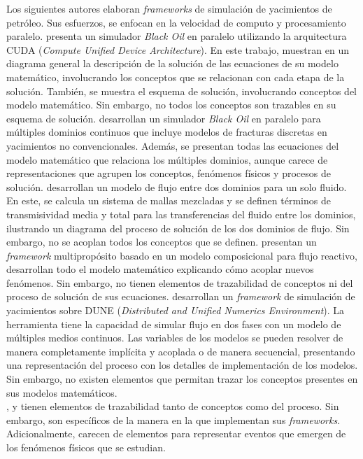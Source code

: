 Los siguientes autores elaboran \textit{frameworks} de simulación de yacimientos de petróleo. Sus esfuerzos, se enfocan en la velocidad de computo y procesamiento paralelo. \cite{Zaza2016} presenta un simulador \textit{Black Oil} en paralelo utilizando la arquitectura CUDA (\textit{Compute Unified Device Architecture}). En este trabajo, \cite{Zaza2016} muestran en un diagrama general la descripción de la solución de las ecuaciones de su modelo matemático, involucrando los conceptos que se relacionan con cada etapa de la solución. También, se muestra el esquema de solución, involucrando conceptos del modelo matemático. Sin embargo, no todos los conceptos son trazables en su esquema de solución. \cite{Wang2016, Wang2017} desarrollan un simulador \textit{Black Oil} en paralelo para múltiples dominios continuos que incluye modelos de fracturas discretas en yacimientos no convencionales. Además, se presentan todas las ecuaciones del modelo matemático que relaciona los múltiples dominios, aunque carece de representaciones que agrupen los conceptos, fenómenos físicos y procesos de solución. \cite{FANG2017} desarrollan un modelo de flujo entre dos dominios para un solo fluido. En este, se calcula un sistema de mallas mezcladas y se definen términos de transmisividad media y total para las transferencias del fluido entre los dominios, ilustrando un diagrama del proceso de solución de los dos dominios de flujo. Sin embargo, no se acoplan todos los conceptos que se definen. \cite{Qiao2017} presentan un \textit{framework} multipropósito basado en un modelo composicional para flujo reactivo, desarrollan todo el modelo matemático explicando cómo acoplar nuevos fenómenos. Sin embargo, no tienen elementos de trazabilidad de conceptos ni del proceso de solución de sus ecuaciones. \cite{Flemisch2011} desarrollan un \textit{framework} de simulación de yacimientos sobre DUNE (\textit{Distributed and Unified Numerics Environment})\citep{DUNE24:16}. La herramienta tiene la capacidad de simular flujo en dos fases con un modelo de múltiples medios continuos. Las variables de los modelos se pueden resolver de manera completamente implícita y acoplada o de manera secuencial, presentando una representación del proceso con los detalles de implementación de los modelos. Sin embargo, no existen elementos que permitan trazar los conceptos presentes en sus modelos matemáticos. \\

\cite{Cao2002}, \cite{DeBaun2005} y \cite{ZHANG2007135} tienen elementos de trazabilidad tanto de conceptos como del proceso. Sin embargo, son específicos de la manera en la que implementan sus \textit{frameworks}. Adicionalmente, carecen de elementos para representar eventos que emergen de los fenómenos físicos que se estudian.\\

